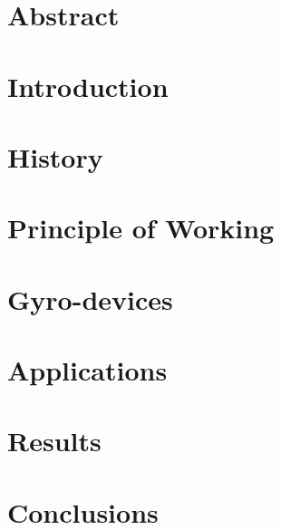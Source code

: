 \documentclass[12pt, oneside]{report}
\date{2018}
\begin{document}


\chapter*{Abstract}


\cleardoublepage

\tableofcontents

\listoftables
\thispagestyle{empty}

\listoffigures
\thispagestyle{empty}

\chapter{Introduction}

\chapter{History}

\chapter{Principle of Working}

\chapter{Gyro-devices}

\chapter{Applications}

\chapter{Results}

\chapter{Conclusions}



\pagebreak

\end{document}
